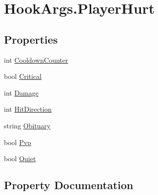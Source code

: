 \hypertarget{structOTA_1_1Plugin_1_1HookArgs_1_1PlayerHurt}{}\section{Hook\+Args.\+Player\+Hurt}
\label{structOTA_1_1Plugin_1_1HookArgs_1_1PlayerHurt}
\subsection*{Properties}
\begin{DoxyCompactItemize}
\item 
int \hyperlink{structOTA_1_1Plugin_1_1HookArgs_1_1PlayerHurt_a7bceb5830e29e72a25c066d12b9a91e2}{Cooldown\+Counter}
\item 
bool \hyperlink{structOTA_1_1Plugin_1_1HookArgs_1_1PlayerHurt_ad129630f5a0296046dce8ea5f79f5629}{Critical}
\item 
int \hyperlink{structOTA_1_1Plugin_1_1HookArgs_1_1PlayerHurt_ab16a3ebb727a38f50223c1be2ecd111d}{Damage}
\item 
int \hyperlink{structOTA_1_1Plugin_1_1HookArgs_1_1PlayerHurt_a4278e690a1a75136e8ebce3224d47a60}{Hit\+Direction}
\item 
string \hyperlink{structOTA_1_1Plugin_1_1HookArgs_1_1PlayerHurt_a984f15b6811029d1850ee945c056d08f}{Obituary}
\item 
bool \hyperlink{structOTA_1_1Plugin_1_1HookArgs_1_1PlayerHurt_ad53f57ef2f78ef6c1d83f45961a75487}{Pvp}
\item 
bool \hyperlink{structOTA_1_1Plugin_1_1HookArgs_1_1PlayerHurt_afc3e36491a803235fa4c4fa7a0a3733e}{Quiet}
\end{DoxyCompactItemize}


\subsection{Property Documentation}
\hypertarget{structOTA_1_1Plugin_1_1HookArgs_1_1PlayerHurt_a7bceb5830e29e72a25c066d12b9a91e2}{}

